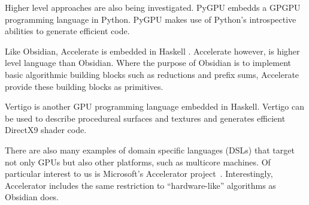 Higher level approaches are also being investigated. PyGPU embedds a GPGPU 
programming language in Python\cite{PyGPU}. PyGPU makes use of Python's 
introspective abilities to generate efficient code. 

Like Obsidian, Accelerate is embedded in Haskell \cite{GPUGEN}. Accelerate 
however, is higher level language than Obsidian. Where the purpose of 
Obsidian is to implement basic algorithmic building blocks such as 
reductions and prefix sums, Accelerate provide these building blocks as 
primitives. 

Vertigo is another GPU programming language embedded in Haskell\cite{VERTIGO}.
Vertigo can be used to describe procedureal surfaces and textures and generates
efficient DirectX9 shader code. 

There are also many examples of domain specific languages (DSLs)
that target not only GPUs but also other platforms, such as multicore machines.
Of particular interest to us is Microsoft's Accelerator project~\cite{ACCELERATOR}. Interestingly, Accelerator includes the same restriction to ``hardware-like'' algorithms as Obsidian does.



 





